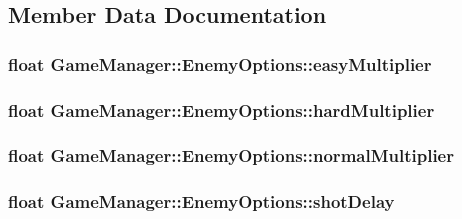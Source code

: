 \subsection{Member Data Documentation}
\hypertarget{struct_game_manager_1_1_enemy_options_a729016937f52d23ded5de91e1e9afefe}{
\subsubsection[{easyMultiplier}]{\setlength{\rightskip}{0pt plus 5cm}float {\bf GameManager::EnemyOptions::easyMultiplier}}}
\label{d9/dd3/struct_game_manager_1_1_enemy_options_a729016937f52d23ded5de91e1e9afefe}
\hypertarget{struct_game_manager_1_1_enemy_options_a1b3e4459a84d6f5682f31863bd508a19}{
\subsubsection[{hardMultiplier}]{\setlength{\rightskip}{0pt plus 5cm}float {\bf GameManager::EnemyOptions::hardMultiplier}}}
\label{d9/dd3/struct_game_manager_1_1_enemy_options_a1b3e4459a84d6f5682f31863bd508a19}
\hypertarget{struct_game_manager_1_1_enemy_options_a591f4b05735d2e32b330f5e2680d4719}{
\subsubsection[{normalMultiplier}]{\setlength{\rightskip}{0pt plus 5cm}float {\bf GameManager::EnemyOptions::normalMultiplier}}}
\label{d9/dd3/struct_game_manager_1_1_enemy_options_a591f4b05735d2e32b330f5e2680d4719}
\hypertarget{struct_game_manager_1_1_enemy_options_a751ac940c54fb14b33d75015cb5e7239}{
\subsubsection[{shotDelay}]{\setlength{\rightskip}{0pt plus 5cm}float {\bf GameManager::EnemyOptions::shotDelay}}}

